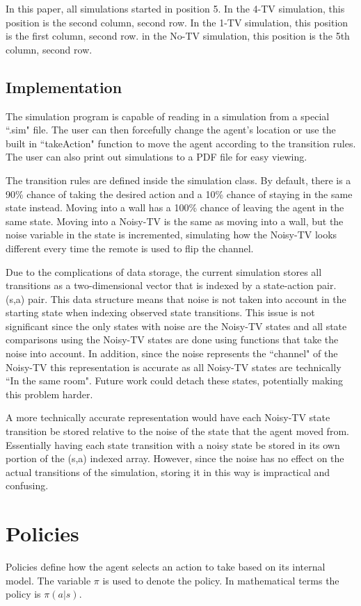 \documentclass[12pt]{thesis}
\begin{document}
In this paper, all simulations started in position 5. In the 4-TV simulation, this position is the second column, second row. In the 1-TV simulation, this position is the first column, second row. in the No-TV simulation, this position is the 5th column, second row.
\subsection{Implementation}
The simulation program is capable of reading in a simulation from a special ``.sim" file. The user can then forcefully change the agent's location or use the built in ``takeAction" function to move the agent according to the transition rules. The user can also print out simulations to a PDF file for easy viewing.

The transition rules are defined inside the simulation class. By default, there is a 90\% chance of taking the desired action and a 10\% chance of staying in the same state instead. Moving into a wall has a 100\% chance of leaving the agent in the same state. Moving into a Noisy-TV is the same as moving into a wall, but the noise variable in the state is incremented, simulating how the Noisy-TV looks different every time the remote is used to flip the channel.

Due to the complications of data storage, the current simulation stores all transitions as a two-dimensional vector that is indexed by a state-action pair. (s,a) pair. This data structure means that noise is not taken into account in the starting state when indexing observed state transitions. This issue is not significant since the only states with noise are the Noisy-TV states and all state comparisons using the Noisy-TV states are done using functions that take the noise into account. In addition, since the noise represents the ``channel" of the Noisy-TV this representation is accurate as all Noisy-TV states are technically ``In the same room". Future work could detach these states, potentially making this problem harder.

A more technically accurate representation would have each Noisy-TV state transition be stored relative to the noise of the state that the agent moved from. Essentially having each state transition with a noisy state be stored in its own portion of the (s,a) indexed array. However, since the noise has no effect on the actual transitions of the simulation, storing it in this way is impractical and confusing.

\section{Policies}
Policies define how the agent selects an action to take based on its internal model. The variable $\pi$ is used to denote the policy. In mathematical terms the policy is $\pi(a | s)$.
\end{document}
